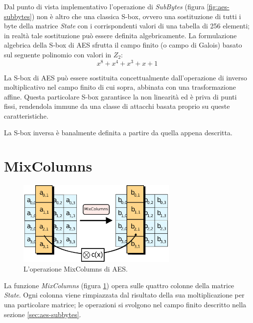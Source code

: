 \documentclass[12pt,a4paper,oneside]{book}
\begin{document}
Dal punto di vista implementativo l'operazione di \textit{SubBytes} (figura \ref{fig:aes-subbytes}) non è altro che una classica \ac{S-box}, ovvero una sostituzione di tutti i byte della matrice \textit{State} con i corrispondenti valori di una tabella di 256 elementi; in realtà tale sostituzione può essere definita algebricamente. La formulazione algebrica della \ac{S-box} di \ac{AES} sfrutta il campo finito (o campo di Galois) basato sul seguente polinomio con valori in $Z_2$:
\begin{displaymath}
x^8 + x^4 + x^3 + x + 1
\end{displaymath}

La \ac{S-box} di \ac{AES} può essere sostituita concettualmente dall'operazione di inverso moltiplicativo nel campo finito di cui sopra, abbinata con una trasformazione affine. Questa particolare \ac{S-box} garantisce la non linearità ed è priva di punti fissi, rendendola immune da una classe di attacchi basata proprio su queste caratteristiche\cite{bib:stinson}.

La \ac{S-box} inversa è banalmente definita a partire da quella appena descritta.

\section{MixColumns}

\begin{figure}[h]
\begin{center}
\includegraphics[width=0.7\textwidth]{img/mixcolumns}
\caption{L'operazione MixColumns di AES.\label{fig:aes-mixcolumns}}
\end{center}
\end{figure}

La funzione \textit{MixColumns} (figura \ref{fig:aes-mixcolumns}) opera sulle quattro colonne della matrice \textit{State}. Ogni colonna viene rimpiazzata dal risultato della sua moltiplicazione per una particolare matrice; le operazioni si svolgono nel campo finito descritto nella sezione \ref{sec:aes-subbytes}.
\end{document}
